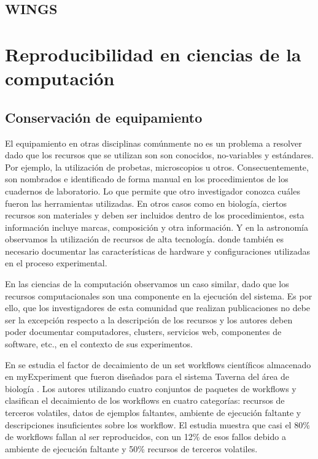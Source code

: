 \subsection{WINGS}

\section{Reproducibilidad en ciencias de la computación}

\subsection{Conservación de equipamiento}
El equipamiento en otras disciplinas comúnmente no es un problema a resolver dado que los recursos que se utilizan son son conocidos, no-variables y estándares. Por ejemplo, la utilización de probetas, microscopios u otros. Consecuentemente, son nombrados e identificado de forma manual en los procedimientos de los cuadernos de laboratorio. Lo que permite que otro investigador conozca cuáles fueron las herramientas utilizadas.
En otros casos como en biología, ciertos recursos son materiales y deben ser incluidos dentro de los procedimientos, esta información incluye marcas, composición y otra información. Y en la astronomía observamos  la utilización de recursos  de alta tecnología. donde también es necesario documentar las características de hardware y configuraciones utilizadas en el proceso experimental. 

En las ciencias de la computación observamos un caso similar, dado que los recursos computacionales son una componente en la ejecución del sistema. 
Es por ello, que los investigadores de esta comunidad que realizan publicaciones no debe ser la excepción respecto a la descripción de los recursos y los autores deben poder documentar computadores, clusters, servicios web, componentes de software, etc., en el contexto de sus experimentos.

En \cite{DBLP:conf/eScience/ZhaoGBKGGHRRG12} se estudia el factor de decaimiento de un set workflows científicos almacenado en myExperiment que fueron diseñados para el sistema Taverna del área de biología . Los autores utilizando cuatro conjuntos de paquetes de workflows y clasifican el decaimiento de los workflows en cuatro categorías: recursos de terceros volatiles, datos de ejemplos faltantes, ambiente de ejecución faltante y descripciones insuficientes sobre los workflow. El estudia muestra que casi el 80\% de workflows fallan al ser reproducidos, con un 12\% de esos fallos debido a ambiente de ejecución faltante y 50\% recursos de terceros volatiles.

